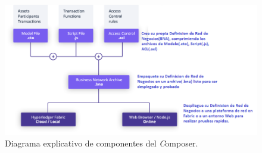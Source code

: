 \begin{figure}[h]
\centering
\includegraphics[width=1\textwidth]{composer-playground.png}
\caption[Fabric and Composer]{Diagrama explicativo de componentes del \textit Composer.}
\label{fig: composer-bna}
\end{figure}


